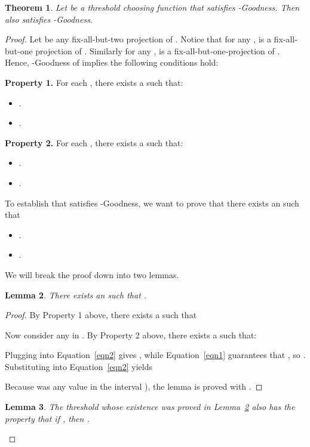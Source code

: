 \documentclass{article}
\newtheorem{theorem}{Theorem}[section]
\newtheorem{lemma}[theorem]{Lemma}
\begin{document}
\begin{theorem} \label{thm:1implies2}
Let  be a threshold choosing function that satisfies -Goodness. Then  also satisfies -Goodness.
\end{theorem}
\begin{proof}
Let  be any fix-all-but-two projection of . Notice that
for any ,  is a fix-all-but-one projection of .
Similarly for any ,  is a fix-all-but-one-projection of . Hence, -Goodness of 
implies the following conditions hold:

\medskip \noindent \textbf{Property 1.} For each , there exists a  such that:
\begin{itemize}
\item .
\item .
\end{itemize}

\medskip \noindent \textbf{Property 2.} For each , there exists a  such that:
\begin{itemize}
\item .
\item .
\end{itemize}


To establish that  satisfies -Goodness, we want to prove that  there exists an  such that

\begin{itemize}
\item .
\item .
\end{itemize}

\noindent We will break the proof down into two lemmas.

\begin{lemma}\label{lemma1}
There exists an  such that
.
\end{lemma}
\begin{proof}

\noindent By Property 1 above, there exists a  such that 


\noindent Now consider any  in .
By Property 2 above, there exists a  such that:


\noindent Plugging  into Equation~\eqref{eqn2} gives
, while Equation~\eqref{eqn1} guarantees that
, so . Substituting 
into Equation~\eqref{eqn2} yields 


\noindent Because  was any value in the interval ), the lemma is proved with .
\end{proof}

\begin{lemma}\label{lemma2}
The threshold  whose existence was proved in Lemma~\ref{lemma1} also has the
property that if , then .


\end{lemma}
\end{proof}
\end{document}
